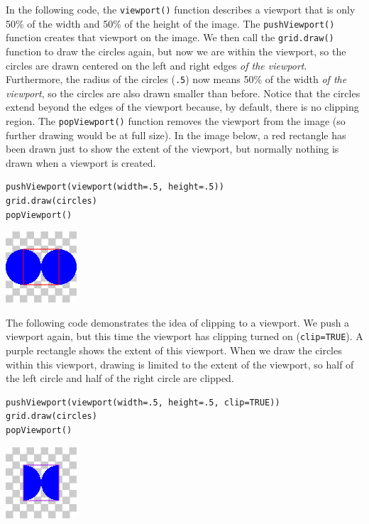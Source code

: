 In the following code,
the \texttt{viewport()} function describes a viewport that is only 50\%
of the width and 50\% of the height of the image. The
\texttt{pushViewport()} function creates that viewport on the image.
We then call the \texttt{grid.draw()} function to draw the circles again,
but now we are within the viewport,
so the circles are drawn centered on the left and right edges
\emph{of the viewport}. Furthermore,
the radius of the circles (\texttt{.5})
now means 50\% of the width \emph{of the viewport}, so the circles
are also drawn smaller than before. Notice that the circles
extend beyond the edges of the viewport because, by default,
there is no clipping region.
The \texttt{popViewport()} function removes the viewport from the image
(so further drawing would be at full size).
In the image below, a red rectangle has been drawn just to show
the extent of the viewport, but normally nothing is drawn when
a viewport is created.

\begin{verbatim}
pushViewport(viewport(width=.5, height=.5))
grid.draw(circles)
popViewport()
\end{verbatim}

\includegraphics{murrell-definitions-2023_files/figure-latex/unnamed-chunk-15-1.png}

The following code demonstrates the idea of clipping to a viewport.
We push a viewport again, but this time the viewport has clipping
turned on (\texttt{clip=TRUE}). A purple rectangle
shows the extent of this viewport. When we draw the circles within
this viewport, drawing
is limited to the extent of the viewport, so half of the
left circle and half of the right circle are clipped.

\begin{verbatim}
pushViewport(viewport(width=.5, height=.5, clip=TRUE))
grid.draw(circles)
popViewport()
\end{verbatim}

\includegraphics{murrell-definitions-2023_files/figure-latex/unnamed-chunk-16-1.png}

